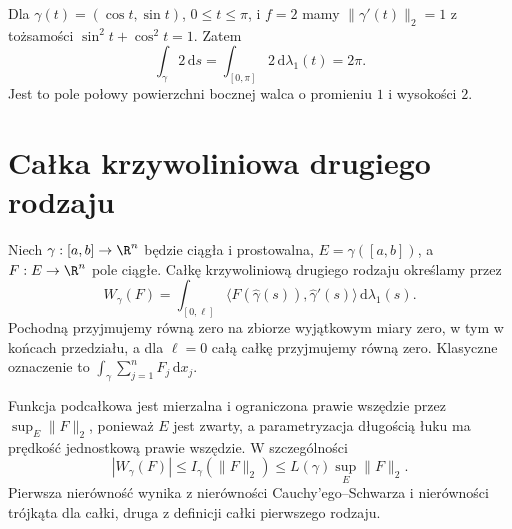 \begin{przyklad}
\label{ma2:ex:line-curtain-semicircle}
Dla $\gamma(t)=(\cos t,\sin t)$, $0\le t\le\pi$,
i $f=2$ mamy $\|\gamma'(t)\|_2=1$ z tożsamości
$\sin^2t+\cos^2t=1$. Zatem
\[
 \int_\gamma 2\,\mathrm ds
 =\int_{[0,\pi]}2\,\mathrm d\lambda_1(t)=2\pi.
\]
Jest to pole połowy powierzchni bocznej walca
o promieniu $1$ i wysokości $2$.
\end{przyklad}

\section{Całka krzywoliniowa drugiego rodzaju}

\begin{definicja}
\label{ma2:def:line-second}
Niech $\gamma:[a,b]\to\R^n$ będzie ciągła
i prostowalna, $E=\gamma([a,b])$, a
$F:E\to\R^n$ pole ciągłe.
Całkę krzywoliniową drugiego rodzaju określamy
przez
\[
 W_\gamma(F)=\int_{[0,\ell]}
 \langle F(\widehat\gamma(s)),\widehat\gamma'(s)\rangle
 \,\mathrm d\lambda_1(s).
\]
Pochodną przyjmujemy równą zero na zbiorze
wyjątkowym miary zero, w tym w końcach przedziału,
a dla $\ell=0$
całą całkę przyjmujemy równą zero.
Klasyczne oznaczenie to
$\int_\gamma\sum_{j=1}^n F_j\,\mathrm dx_j$.
\end{definicja}

Funkcja podcałkowa jest mierzalna
i ograniczona prawie wszędzie przez
$\sup_E\|F\|_2$, ponieważ $E$ jest zwarty,
a parametryzacja długością łuku ma
prędkość jednostkową prawie wszędzie.
W szczególności
\[
 |W_\gamma(F)|\le I_\gamma(\|F\|_2)
 \le L(\gamma)\sup_E\|F\|_2.
\]
Pierwsza nierówność wynika z nierówności
Cauchy'ego--Schwarza i nierówności trójkąta
dla całki, druga z definicji całki
pierwszego rodzaju.

